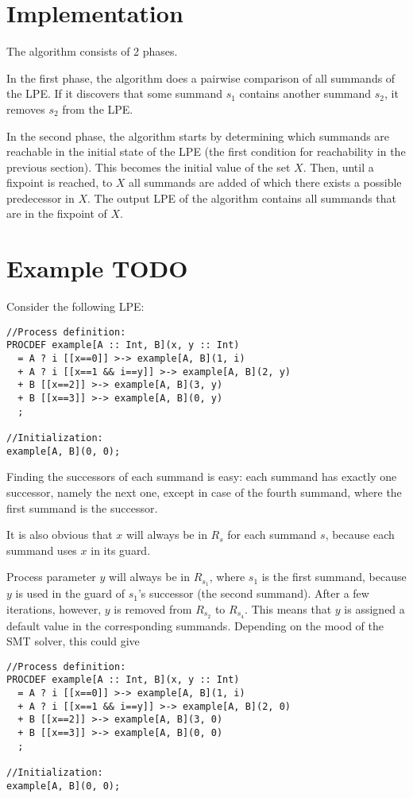 \section{Implementation}

The algorithm consists of 2 phases.

In the first phase, the algorithm does a pairwise comparison of all summands of the LPE.
If it discovers that some summand $s_1$ contains another summand $s_2$, it removes $s_2$ from the LPE.

In the second phase, the algorithm starts by determining which summands are reachable in the initial state of the LPE (the first condition for reachability in the previous section).
This becomes the initial value of the set $X$.
Then, until a fixpoint is reached, to $X$ all summands are added of which there exists a possible predecessor in $X$.
The output LPE of the algorithm contains all summands that are in the fixpoint of $X$.

\section{Example TODO}

Consider the following LPE:

\begin{lstlisting}
//Process definition:
PROCDEF example[A :: Int, B](x, y :: Int)
  = A ? i [[x==0]] >-> example[A, B](1, i)
  + A ? i [[x==1 && i==y]] >-> example[A, B](2, y)
  + B [[x==2]] >-> example[A, B](3, y)
  + B [[x==3]] >-> example[A, B](0, y)
  ;

//Initialization:
example[A, B](0, 0);
\end{lstlisting}

Finding the successors of each summand is easy: each summand has exactly one successor, namely the next one, except in case of the fourth summand, where the first summand is the successor.

It is also obvious that $x$ will always be in $R_s$ for each summand $s$, because each summand uses $x$ in its guard.

Process parameter $y$ will always be in $R_{s_1}$, where $s_1$ is the first summand, because $y$ is used in the guard of $s_1$'s successor (the second summand).
After a few iterations, however, $y$ is removed from $R_{s_2}$ to $R_{s_4}$.
This means that $y$ is assigned a default value in the corresponding summands.
Depending on the mood of the SMT solver, this could give

\begin{lstlisting}
//Process definition:
PROCDEF example[A :: Int, B](x, y :: Int)
  = A ? i [[x==0]] >-> example[A, B](1, i)
  + A ? i [[x==1 && i==y]] >-> example[A, B](2, 0)
  + B [[x==2]] >-> example[A, B](3, 0)
  + B [[x==3]] >-> example[A, B](0, 0)
  ;

//Initialization:
example[A, B](0, 0);
\end{lstlisting}




